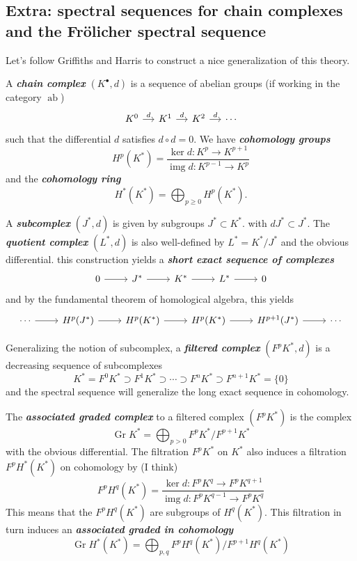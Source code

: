 \subsection{Extra: spectral sequences for chain complexes and the Fr\"olicher spectral sequence}
Let's follow Griffiths and Harris to construct a nice generalization of this theory.

A \textit{\textbf{chain complex}} $(K^\bullet,d)$ is a sequence of abelian groups (if working in the category $\operatorname{ab}$)
\[\begin{tikzcd}[column sep=small]
	K^{0}\arrow[r,"d"]&K^{1}\arrow[r,"d"]&K^2\arrow[r,"d"]&\cdots
\end{tikzcd}\]
such that the differential $d$ satisfies $d\circ d=0$. We have \textit{\textbf{cohomology groups}} 
\[H^{p}(K^*)=\frac{\operatorname{ker} d:K^p\to K^{p+1}}{\operatorname{img} d:K^{p-1}\to K^p}\]
and the \textit{\textbf{cohomology ring}}
\[H^{*}(K^*)=\bigoplus_{p\geq 0} H^{p}(K^*).\]

A \textit{\textbf{subcomplex}} $(J^*,d)$ is given by subgroups $J^*\subset K^*$. with $dJ^*\subset J^*$. The \textit{\textbf{quotient complex}} $(L^*,d)$ is also well-defined by $L^*=K^*/J^*$ and the obvious differential. this construction yields a \textit{\textbf{short exact sequence of complexes}}
\[\begin{tikzcd}
	0\arrow[r]&J^*\arrow[r]&K^*\arrow[r]&L^*\arrow[r]&0
\end{tikzcd}\]
and by the fundamental theorem of homological algebra, this yields
\[\begin{tikzcd}
	\cdots\arrow[r]&H^{p}(J^*)\arrow[r]&H^{p}(K^*)\arrow[r]&H^{p}(K^*)\arrow[r]&H^{p+1}(J^*)\arrow[r]&\cdots
\end{tikzcd}\]

Generalizing the notion of subcomplex, a \textit{\textbf{filtered complex}} $(F^pK^*,d)$ is a decreasing sequence of subcomplexes
\[K^*=F^0K^*\supset F^1K^*\supset\cdots\supset F^nK^*\supset F^{n+1}K^*=\{0\}\]
and the spectral sequence will generalize the long exact sequence in cohomology.

The \textit{\textbf{associated graded complex}} to a filtered complex $ (F^pK^*)$ is the complex
\[\operatorname{Gr}K^*=\bigoplus_{p>0} F^pK^*/F^{p+1}K^* \]
with the obvious differential. The filtration $F^pK^*$ on $K^*$ also induces a filtration $F^pH^*(K^*)$ on cohomology by {\color{blue}(I think)}
\[F^pH^q(K^*)=\frac{\operatorname{ker} d:F^pK^q\to F^pK^{q+1}}{\operatorname{img} d:F^pK^{q-1}\to F^pK^q}\]
This means that the $F^pH^q(K^*)$ are subgroups of $H^{q}(K^*)$. This filtration in turn induces an \textit{\textbf{associated graded in cohomology}}
\[\operatorname{Gr}H^*(K^*)=\bigoplus_{p,q}F^pH^q(K^*)\big/F^{p+1}H^q(K^*)  \]

